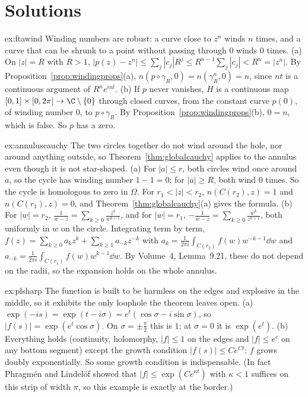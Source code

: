 \section{Solutions}

\begin{solution}{ex:ftawind}
\idea Winding numbers are robust: a curve close to $z^n$ winds $n$ times, and a curve that can be shrunk to a point without passing through $0$ winds $0$ times.
\writeup (a) On $|z|=R$ with $R>1$, $|p(z)-z^n|\le\sum_j|c_j|R^j\le R^{n-1}\sum_j|c_j|<R^n=|z^n|$. By Proposition~\ref{prop:windingprops}(a), $n(p\circ\gamma_R,0)=n(\gamma_R^n,0)=n$, since $nt$ is a
continuous argument of $R^ne^{int}$. (b) If $p$ never vanishes, $H$ is a continuous map $[0,1]\times[0,2\pi]\to\C\setminus\{0\}$ through closed curves, from the constant curve $p(0)$, of winding number $0$, to
$p\circ\gamma_R$. By Proposition~\ref{prop:windingprops}(b), $0=n$, which is false. So $p$ has a zero.
\end{solution}

\begin{solution}{ex:annuluscauchy}
\idea The two circles together do not wind around the hole, nor around anything outside, so Theorem~\ref{thm:globalcauchy} applies to the annulus even though it is not star-shaped.
\writeup (a) For $|a|\le r$, both circles wind once around $a$, so the cycle has winding number $1-1=0$; for $|a|\ge R$, both wind $0$ times. So the cycle is homologous to zero in $\Omega$. For
$r_1<|z|<r_2$, $n(C(r_2),z)=1$ and $n(C(r_1),z)=0$, and Theorem~\ref{thm:globalcauchy}(a) gives the formula. (b) For $|w|=r_2$, $\frac1{w-z}=\sum_{k\ge0}\frac{z^k}{w^{k+1}}$, and for $|w|=r_1$,
$-\frac1{w-z}=\sum_{k\ge0}\frac{w^k}{z^{k+1}}$, both uniformly in $w$ on the circle. Integrating term by term, $f(z)=\sum_{k\ge0}a_kz^k+\sum_{k\ge1}a_{-k}z^{-k}$ with $a_k=\frac1{2\pi i}\int_{C(r_2)}f(w)w^{-k-1}\dd w$ and
$a_{-k}=\frac1{2\pi i}\int_{C(r_1)}f(w)w^{k-1}\dd w$. By Volume~4, Lemma~9.21, these do not depend on the radii, so the expansion holds on the whole annulus.
\end{solution}

\begin{solution}{ex:plsharp}
\idea The function is built to be harmless on the edges and explosive in the middle, so it exhibits the only loophole the theorem leaves open.
\writeup (a) $\exp(-is)=\exp(t-i\sigma)=e^t(\cos\sigma-i\sin\sigma)$, so $|f(s)|=\exp(e^t\cos\sigma)$. On $\sigma=\pm\frac\pi2$ this is $1$; at $\sigma=0$ it is $\exp(e^t)$. (b) Everything holds (continuity, holomorphy,
$|f|\le1$ on the edges and $|f|\le e^e$ on any bottom segment) except the growth condition $|f(s)|\le Ce^{Ct}$: $f$ grows doubly exponentially. So some growth condition is indispensable. (In fact
Phragm\'en and Lindel\"of showed that $|f|\le\exp(Ce^{\kappa t})$ with $\kappa<1$ suffices on this strip of width $\pi$, so this example is exactly at the border.)
\end{solution}

